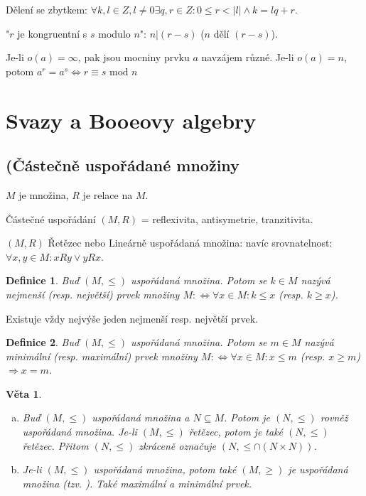 \documentclass[a4paper, 11pt]{report}
\newtheorem{mydef}{Definice}[chapter]
\newtheorem{veta}{Věta}
\begin{document}
Dělení se zbytkem: $\forall k,l \in Z, l \not= 0 \exists q,r \in Z: 0 \leq  r < |l| \land k = lq + r$.

"$r$ je kongruentní s $s$ modulo $n$": $n|(r - s)$ ($n$ dělí $(r-s)$).

Je-li $o(a) = \infty$, pak jsou mocniny prvku $a$ navzájem různé. Je-li $o(a) = n$, potom $a^r = a^s \Leftrightarrow r \equiv s \text{ mod } n$



\section{Svazy a Booeovy algebry}
\subsection{(Částečně uspořádané množiny}

$M$ je množina, $R$ je relace na $M$. 

Částečné uspořádání $(M, R)$ = reflexivita, antisymetrie, tranzitivita.

$(M, R)$ Řetězec nebo Lineárně uspořádaná množina: navíc srovnatelnost: $\forall x,y \in M: xRy \lor yRx$.

\begin{mydef}
Buď $(M, \leq)$ uspořádaná množina. Potom se $k \in M$ nazývá nejmenší (resp. největší) prvek množiny $M :\Leftrightarrow \forall x \in M: k \leq x$ (resp. $k \geq x$).
\end{mydef}

Existuje vždy nejvýše jeden nejmenší resp. největší prvek.

\begin{mydef}
Buď $(M, \leq)$ uspořádaná množina. Potom se $m \in M$ nazývá minimální (resp. maximální) prvek množiny $M :\Leftrightarrow \forall x \in M: x \leq m$ (resp. $x \geq m$) $\Rightarrow x = m$.
\end{mydef}

\begin{veta}
\begin{enumerate}[a)]
	\item Buď $(M, \leq)$ uspořádaná množina a $N \subseteq M$. Potom je $(N, \leq)$ rovněž uspořádaná množina. Je-li $(M, \leq)$ řetězec, potom je také $(N, \leq)$ řetězec. Přitom $(N, \leq)$ zkráceně označuje $(N, \leq \cap (N \times N))$.
	\item Je-li $(M, \leq)$ uspořádaná množina, potom také $(M, \geq)$ je uspořádaná množina (tzv. ). Také maximální a minimální prvek.
\end{enumerate}
\end{veta}
\end{document}

